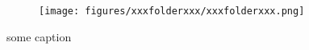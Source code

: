 \begin{figure}[bt]
\centering

\begin{subfigure}{0.49\textwidth}
    \centering
    \texttt{[image: figures/xxxfolderxxx/xxxfolderxxx.png]}
\end{subfigure}

    \caption{some caption
    \label{fig:short}}

\end{figure}    

